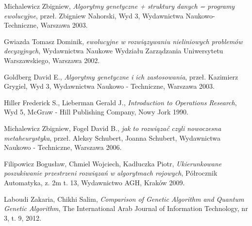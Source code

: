 

\begin{thebibliography}{99}

%
%
%
%
%

 Michalewicz Zbigniew, \textit{Algorytmy genetyczne + struktury danych = programy ewolucyjne}, przeł. Zbigniew Nahorski, Wyd 3, Wydawnictwa Naukowo-  Techniczne, Warszawa 2003.

 Gwiazda Tomasz Dominik, \textit{ ewolucyjne w rozwiązywaniu nieliniowych problemów decyzyjnych}, Wydawnictwa Naukowe Wydziału Zarządzania Uniwersytetu Warszawskiego, Warszawa 2002.

 Goldberg David E., \textit{Algorytmy genetyczne i ich zastosowania}, przeł. Kazimierz Grygiel, Wyd 3, Wydawnictwa Naukowo - Techniczne, Warszawa 2003.

 Hiller Frederick S., Lieberman Gerald J., \textit{Introduction to Operations Research}, Wyd 5, McGraw - Hill Publishing Company, Nowy Jork 1990.

 Michalewicz Zbigniew, Fogel David B., \textit{jak to rozwiązać czyli nowoczesna metaheurystyka}, przeł. Aleksy Schubert, Joanna Schubert, Wydawnictwa Naukowo - Techniczne, Warszawa 2006.

 Filipowicz Bogusław, Chmiel Wojciech, Kadłuczka Piotr, \textit{Ukierunkowane poszukiwanie przestrzeni rozwiązań w algorytmach rojowych}, Półrocznik Automatyka, z. 2m t. 13, Wydawnictwo AGH, Kraków 2009.

 Laboudi Zakaria, Chikhi Salim,  \textit{Comparison of Genetic Algorithm and Quantum
Genetic Algorithm}, The International Arab Journal of Information Technology, nr 3, t. 9, 2012.


\end{thebibliography}
